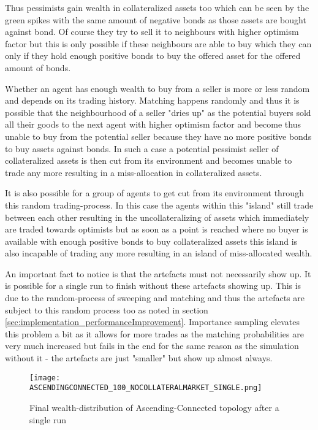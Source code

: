 \documentclass[Bachelorarbeit.tex]{subfiles}
\begin{document}
\medskip 

Thus pessimists gain wealth in collateralized assets too which can be seen by the green spikes with the same amount of negative bonds as those assets are bought against bond. Of course they try to sell it to neighbours with higher optimism factor but this is only possible if these neighbours are able to buy which they can only if they hold enough positive bonds to buy the offered asset for the offered amount of bonds.

\medskip 

Whether an agent has enough wealth to buy from a seller is more or less random and depends on its trading history. Matching happens randomly and thus it is possible that the neighbourhood of a seller "dries up" as the potential buyers sold all their goods to the next agent with higher optimism factor and become thus unable to buy from the potential seller because they have no more positive bonds to buy assets against bonds. In such a case a potential pessimist seller of collateralized assets is then cut from its environment and becomes unable to trade any more resulting in a miss-allocation in collateralized assets.

\medskip 

It is also possible for a group of agents to get cut from its environment through this random trading-process. In this case the agents within this "island" still trade between each other resulting in the uncollateralizing of assets which immediately are traded towards optimists but as soon as a point is reached where no buyer is available with enough positive bonds to buy collateralized assets this island is also incapable of trading any more resulting in an island of miss-allocated wealth.

\medskip 

An important fact to notice is that the artefacts must not necessarily show up. It is possible for a single run to finish without these artefacts showing up. This is due to the random-process of sweeping and matching and thus the artefacts are subject to this random process too as noted in section \ref{sec:implementation_performanceImprovement}. Importance sampling elevates this problem a bit as it allows for more trades as the matching probabilities are very much increased but fails in the end for the same reason as the simulation without it - the artefacts are just "smaller" but show up almost always.

\begin{figure}[H]
	\centering
  \texttt{[image: ASCENDINGCONNECTED\_100\_NOCOLLATERALMARKET\_SINGLE.png]}
	\caption{Final wealth-distribution of Ascending-Connected topology after a single run}
	\label{fig:wealth_ASCENDINGCONNECTED_IS_100_NOCOLLATERALMARKET_SINGLE}
\end{figure}
\end{document}
